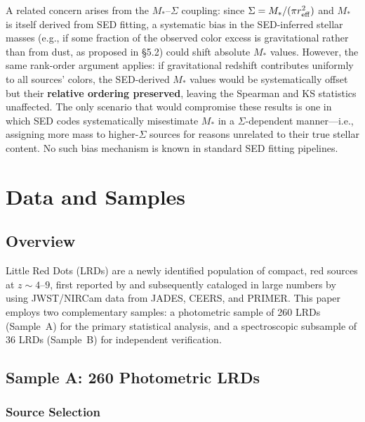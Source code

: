 \documentclass[apj,twocolumn,longbibliography,linenumbers]{aastex701}
\begin{document}
A related concern arises from the $M_*$--$\Sigma$ coupling: since $\Sigma = M_*/(\pi r_{\rm eff}^2)$ and $M_*$ is itself derived from SED fitting, a systematic bias in the SED-inferred stellar masses (e.g., if some fraction of the observed color excess is gravitational rather than from dust, as proposed in \S5.2) could shift absolute $M_*$ values. However, the same rank-order argument applies: if gravitational redshift contributes uniformly to all sources' colors, the SED-derived $M_*$ values would be systematically offset but their \textbf{relative ordering preserved}, leaving the Spearman and KS statistics unaffected. The only scenario that would compromise these results is one in which SED codes systematically misestimate $M_*$ in a $\Sigma$-dependent manner---i.e., assigning more mass to higher-$\Sigma$ sources for reasons unrelated to their true stellar content. No such bias mechanism is known in standard SED fitting pipelines.


\section{Data and Samples}

\subsection{Overview}

Little Red Dots (LRDs) are a newly identified population of compact, red sources at $z \sim 4$--$9$, first reported by \citealt{Labbe2023} and subsequently cataloged in large numbers by \citealt{Kokorev2024} using JWST/NIRCam data from JADES, CEERS, and PRIMER. This paper employs two complementary samples: a photometric sample of 260 LRDs (Sample~A) for the primary statistical analysis, and a spectroscopic subsample of 36 LRDs (Sample~B) for independent verification.

\subsection{Sample A: 260 Photometric LRDs}

\subsubsection{Source Selection}
\end{document}
